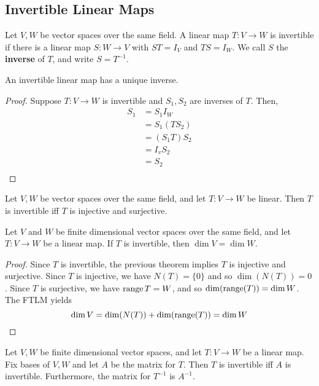 \documentclass{article}
\begin{document}
\subsection{Invertible Linear Maps}
\begin{definition}
  Let $V, W$ be vector spaces over the same field. A linear map $T: V \to W$ is invertible if there is a linear map $S: W \to V$ with $ST = I_V$ and $TS = I_W$. We call $S$ the \textbf{inverse} of $T$, and write $S = T^{-1}$.
\end{definition}
\begin{theorem}
  An invertible linear map has a unique inverse.
\end{theorem}
\begin{proof}
  Suppose $T: V \to W$ is invertible and $S_1, S_2$ are inverses of $T$.
  Then,
  \begin{align*}
    S_1 & = S_1I_W    \\
        & = S_1(TS_2) \\
        & = (S_1T)S_2 \\
        & = I_vS_2    \\
        & = S_2       \\
  \end{align*}
\end{proof}
\begin{theorem}
  Let $V, W$ be vector spaces over the same field, and let $T: V \to W$ be linear. Then $T$ is invertible iff $T$ is injective and surjective.
\end{theorem}
\begin{theorem}
  Let $V$ and $W$ be finite dimensional vector spaces over the same field, and let $T: V \to W$ be a linear map. If $T$ is invertible, then $\dim V = \dim W$.
\end{theorem}
\begin{proof}
  Since $T$ is invertible, the previous theorem implies $T$ is injective and surjective. Since $T$ is injective, we have $N(T) = \{0\}$ and so $\dim(N(T)) = 0$. Since $T$ is surjective, we have $\operatorname{\text{range}} T = W$, and so $\dim(\operatorname{\text{range}}(T)) = \dim W$. The FTLM yields \[
    \dim V = \dim(N(T)) + \dim(\operatorname{\text{range}}(T)) = \dim W
  \]
\end{proof}
\begin{theorem}
  Let $V, W$ be finite dimensional vector spaces, and let $T: V \to W$ be a linear map. Fix bases of $V, W$ and let $A$ be the matrix for $T$. Then $T$ is invertible iff $A$ is invertible. Furthermore, the matrix for $T^{-1}$ is $A^{-1}$.
\end{theorem}
\end{document}
